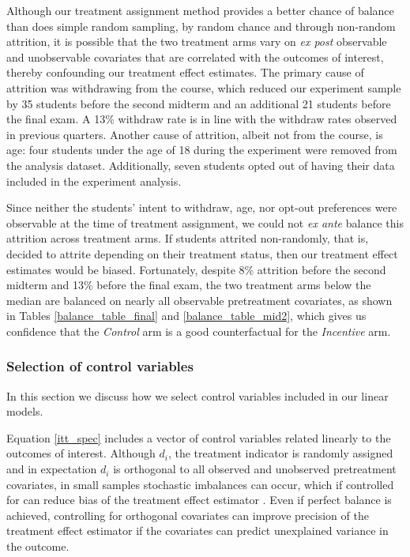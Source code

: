 \documentclass[12pt]{article}
\begin{document}
Although our treatment assignment method provides a better chance of balance than does simple random sampling, by random chance and through non-random attrition, it is possible that the two treatment arms vary on \textit{ex post} observable and unobservable covariates that are correlated with the outcomes of interest, thereby confounding our treatment effect estimates. The primary cause of attrition was withdrawing from the course, which reduced our experiment sample by 35 students before the second midterm and an additional 21 students before the final exam. A 13\% withdraw rate is in line with the withdraw rates observed in previous quarters. Another cause of attrition, albeit not from the course, is age: four students under the age of 18 during the experiment were removed from the analysis dataset. Additionally, seven students opted out of having their data included in the experiment analysis.

Since neither the students' intent to withdraw, age, nor opt-out preferences were observable at the time of treatment assignment, we could not \textit{ex ante} balance this attrition across treatment arms. If students attrited non-randomly, that is, decided to attrite depending on their treatment status, then our treatment effect estimates would be biased. Fortunately, despite 8\% attrition before the second midterm and 13\% before the final exam, the two treatment arms below the median are balanced on nearly all observable pretreatment covariates, as shown in Tables \ref{balance_table_final} and \ref{balance_table_mid2}, which gives us confidence that the \textit{Control} arm is a good counterfactual for the \textit{Incentive} arm.

\subsubsection{Selection of control variables} \label{a_selection}

In this section we discuss how we select control variables included in our linear models.

Equation \ref{itt_spec} includes a vector of control variables related linearly to the outcomes of interest. Although $d_i$, the treatment indicator is randomly assigned and in expectation $d_i$ is orthogonal to all observed and unobserved pretreatment covariates, in small samples stochastic imbalances can occur, which if controlled for can reduce bias of the treatment effect estimator \parencite{ai2017}. Even if perfect balance is achieved, controlling for orthogonal covariates can improve precision of the treatment effect estimator if the covariates can predict unexplained variance in the outcome.
\end{document}

